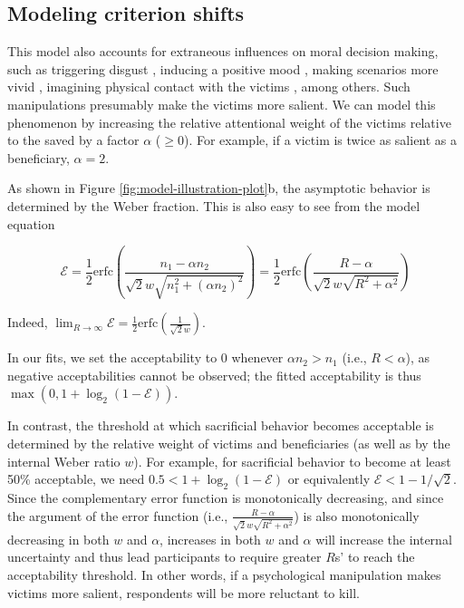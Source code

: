 \documentclass[
]{article}
\begin{document}
\subsection{Modeling criterion shifts}\label{modeling-criterion-shifts}

This model also accounts for extraneous influences on moral decision making, such as triggering disgust \autocite{Bialek2021,Schnall2008}, inducing a positive mood \autocite{Valdesolo2006}, making scenarios more vivid \autocite{Bartels2008}, imagining physical contact with the victims \autocite{Cushman2006}, among others. Such manipulations presumably make the victims more salient. We can model this phenomenon by increasing the relative attentional weight of the victims relative to the saved by a factor \(\alpha\) (\(\geq 0\)). For example, if a victim is twice as salient as a beneficiary, \(\alpha = 2\).

As shown in Figure \ref{fig:model-illustration-plot}b, the asymptotic behavior is determined by the Weber fraction. This is also easy to see from the model equation

\[\mathcal{E} = \frac{1}{2} \text{erfc}\left(\frac{n_1 - \alpha n_2}{\sqrt{2}w\sqrt{n_1^2 + (\alpha n_2)^2}}\right) = \frac{1}{2} \text{erfc}\left(\frac{R - \alpha }{\sqrt{2}w\sqrt{R^2 + \alpha^2}}\right)\]

Indeed, \(\lim_{R\to\infty} \mathcal{E} = \frac{1}{2} \text{erfc}\left(\frac{1}{\sqrt{2}w}\right)\).

In our fits, we set the acceptability to 0 whenever \(\alpha n_2 > n_1\) (i.e., \(R < \alpha\)), as negative acceptabilities cannot be observed; the fitted acceptability is thus \(\max\left(0, 1 + \log_2(1 - \mathcal{E})\right)\).

In contrast, the threshold at which sacrificial behavior becomes acceptable is determined by the relative weight of victims and beneficiaries (as well as by the internal Weber ratio \(w\)). For example, for sacrificial behavior to become at least 50\% acceptable, we need \(0.5 < 1 + \log_2(1-\mathcal{E})\) or equivalently \(\mathcal{E} < 1 - 1/\sqrt{2}\). Since the complementary error function is monotonically decreasing, and since the argument of the error function (i.e., \(\frac{R - \alpha }{\sqrt{2}w\sqrt{R^2 + \alpha^2}}\)) is also monotonically decreasing in both \(w\) and \(\alpha\), increases in both \(w\) and \(\alpha\) will increase the internal uncertainty and thus lead participants to require greater \(R\)s' to reach the acceptability threshold. In other words, if a psychological manipulation makes victims more salient, respondents will be more reluctant to kill.
\end{document}
